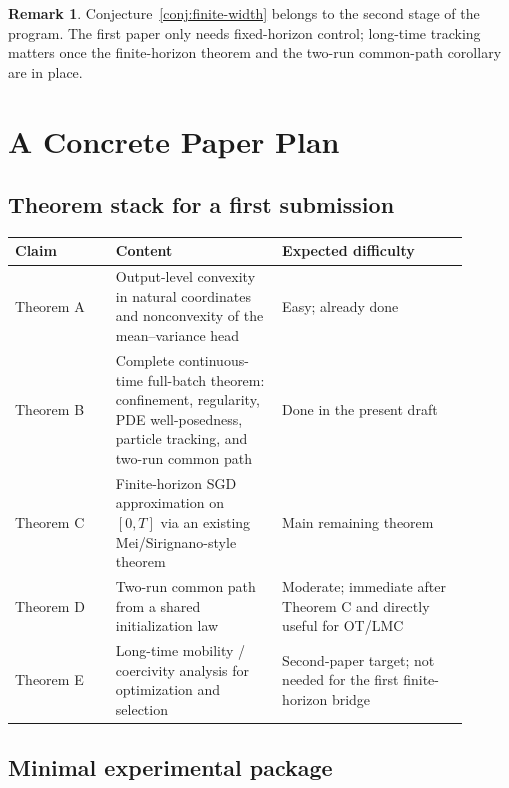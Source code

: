 \documentclass[11pt]{article}
\theoremstyle{definition}
\newtheorem{remark}[theorem]{Remark}
\begin{document}
\begin{remark}
Conjecture~\ref{conj:finite-width} belongs to the second stage of the program.
The first paper only needs fixed-horizon control; long-time tracking matters
once the finite-horizon theorem and the two-run common-path corollary are in
place.
\end{remark}

\section{A Concrete Paper Plan}

\subsection{Theorem stack for a first submission}

\begin{center}
\begin{tabular}{@{}p{0.2\linewidth}p{0.33\linewidth}p{0.37\linewidth}@{}}
\toprule
Claim & Content & Expected difficulty \\
\midrule
Theorem A & Output-level convexity in natural coordinates and nonconvexity of
the mean--variance head & Easy; already done \\
\addlinespace
Theorem B & Complete continuous-time full-batch theorem: confinement,
regularity, PDE well-posedness, particle tracking, and two-run common path &
Done in the present draft \\
\addlinespace
Theorem C & Finite-horizon SGD approximation on $[0,T]$ via an existing
Mei/Sirignano-style theorem & Main remaining theorem \\
\addlinespace
Theorem D & Two-run common path from a shared initialization law & Moderate;
immediate after Theorem C and directly useful for OT/LMC \\
\addlinespace
Theorem E & Long-time mobility / coercivity analysis for optimization and
selection & Second-paper target; not needed for the first finite-horizon bridge \\
\bottomrule
\end{tabular}
\end{center}

\subsection{Minimal experimental package}
\end{document}
